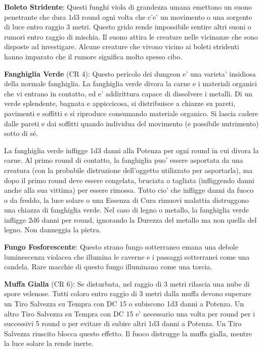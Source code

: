 \documentclass[a4paper,11pt,twoside,openany]{book}
\begin{document}
\textbf{Boleto Stridente}: Questi funghi viola di grandezza umana emettono un suono penetrante che dura 1d3 round ogni volta che c'e' un movimento o una sorgente di luce entro raggio 3 metri. Questo grido rende impossibile sentire altri suoni o rumori entro raggio di mischia. Il suono attira le creature nelle vicinanze che sono disposte ad investigare. Alcune creature che vivono vicino ai boleti stridenti hanno imparato che il rumore significa molto spesso cibo.

\textbf{Fanghiglia Verde} (CR 4): Questo pericolo dei dungeon e' una varieta' insidiosa della normale fanghiglia. La fanghiglia verde divora la carne e i materiali organici che vi entrano in contatto, ed e' addirittura capace di dissolvere i metalli. Di un verde splendente, bagnata e appiccicosa, si distribuisce a chiazze su pareti, pavimenti e soffitti e si riproduce consumando materiale organico. Si lascia cadere dalle pareti e dai soffitti quando individua del movimento (e possibile nutrimento) sotto di sé.

La fanghiglia verde infligge 1d3 danni alla Potenza per ogni round in cui divora la carne. Al primo round di contatto, la fanghiglia puo' essere asportata da una creatura (con la probabile distruzione dell'oggetto utilizzato per asportarla), ma dopo il primo round deve essere congelata, bruciata o tagliata (infliggendo danni anche alla sua vittima) per essere rimossa. Tutto cio' che infligge danni da fuoco o da freddo, la luce solare o una Essenza di Cura rimuovi malattia distruggono una chiazza di fanghiglia verde. Nel caso di legno o metallo, la fanghiglia verde infligge 2d6 danni per round, ignorando la Durezza del metallo ma non quella del legno. Non danneggia la pietra.

\textbf{Fungo Fosforescente}: Questo strano fungo sotterraneo emana una debole luminescenza violacea che illumina le caverne e i passaggi sotterranei come una candela. Rare macchie di questo fungo illuminano come una torcia.

\textbf{Muffa Gialla} (CR 6): Se disturbata, nel raggio di 3 metri rilascia una nube di spore velenose. Tutti coloro entro raggio di 3 metri dalla muffa devono superare un Tiro Salvezza su Tempra con DC 15 o subiscono 1d3 danni a Potenza. Un altro Tiro Salvezza su Tempra con DC 15 e' necessario una volta per round per i successivi 5 round o per evitare di subire altri 1d3 danni a Potenza. Un Tiro Salvezza riuscito blocca questo effetto. Il fuoco distrugge la muffa gialla, mentre la luce solare la rende inerte.
\end{document}
